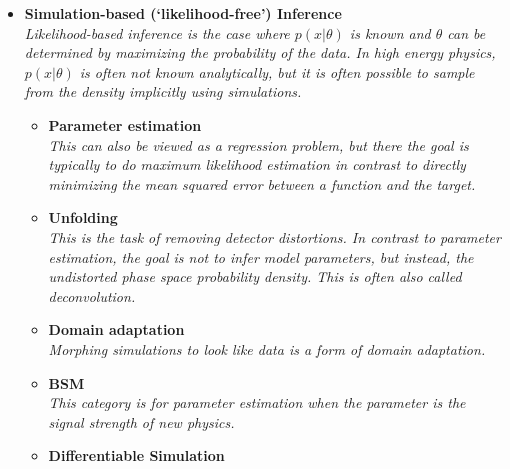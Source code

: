 \documentclass[12pt,letterpaper]{article}
\begin{document}
\begin{itemize}
\item \textbf{Simulation-based (`likelihood-free') Inference}
\\\textit{Likelihood-based inference is the case where $p(x|\theta)$ is known and $\theta$ can be determined by maximizing the probability of the data.  In high energy physics, $p(x|\theta)$ is often not known analytically, but it is often possible to sample from the density implicitly using simulations.}
	\begin{itemize}
		\item \textbf{Parameter estimation}~\cite{Andreassen:2019nnm,Stoye:2018ovl,Hollingsworth:2020kjg,Brehmer:2018kdj,Brehmer:2018eca,Brehmer:2019xox,Brehmer:2018hga,Cranmer:2015bka,Andreassen:2020gtw,Coogan:2020yux,Flesher:2020kuy,Bieringer:2020tnw,Nachman:2021yvi,Chatterjee:2021nms,NEURIPS2020_a878dbeb,Mishra-Sharma:2021oxe,Barman:2021yfh,Bahl:2021dnc,Arganda:2022qzy,Kong:2022rnd}
		\\\textit{This can also be viewed as a regression problem, but there the goal is typically to do maximum likelihood estimation in contrast to directly minimizing the mean squared error between a function and the target.}
		\item \textbf{Unfolding}~\cite{Andreassen:2019cjw,Datta:2018mwd,Bellagente:2019uyp,Gagunashvili:2010zw,Glazov:2017vni,Martschei:2012pr,Lindemann:1995ut,Zech2003BinningFreeUB,1800956,Vandegar:2020yvw,Howard:2021pos,Baron:2021vvl,Andreassen:2021zzk,Komiske:2021vym,H1:2021wkz,Arratia:2021otl,Wong:2021zvv,Arratia:2022wny}
		\\\textit{This is the task of removing detector distortions.  In contrast to parameter estimation, the goal is not to infer model parameters, but instead, the undistorted phase space probability density.  This is often also called deconvolution.}
		\item \textbf{Domain adaptation}~\cite{Rogozhnikov:2016bdp,Andreassen:2019nnm,Cranmer:2015bka,2009.03796,Nachman:2021opi,Camaiani:2022kul}
		\\\textit{Morphing simulations to look like data is a form of domain adaptation.}
		\item \textbf{BSM}~\cite{Andreassen:2020nkr,Hollingsworth:2020kjg,Brehmer:2018kdj,Brehmer:2018eca,Brehmer:2018hga,Brehmer:2019xox,Romao:2020ojy,deSouza:2022uhk,GomezAmbrosio:2022mpm}
		\\\textit{This category is for parameter estimation when the parameter is the signal strength of new physics.}
		\item \textbf{Differentiable Simulation}~\cite{Heinrich:2022xfa,Nachman:2022jbj}

\end{itemize}
\end{itemize}
\end{document}
